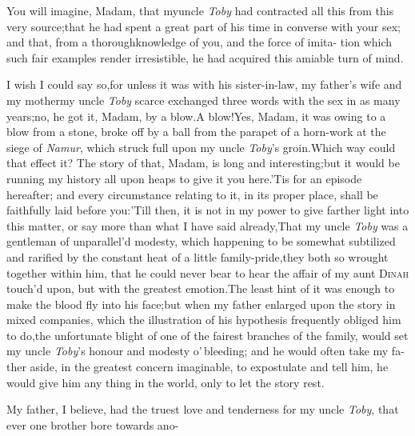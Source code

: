 \documentclass{article}
\begin{document}
You will imagine, Madam, that my\break uncle \textit{Toby} had
contracted all this from this very source;\tsk  that he had spent a great
part of his time in converse with your sex; and that, from a
thorough\break knowledge of you, and the force of imita- tion which such
fair examples render irresistible, he had acquired this amiable
turn of mind.

I wish I could say so,\tsk  for unless it was with his
sister-in-law, my father’s wife and my mother\tsh  my
uncle \textit{Toby} scarce exchanged three words with the sex in as
many years;\tsh  no, he got it, Madam, by a
blow.\tsh  A blow!\tsk  Yes, Madam, it was owing to a
blow from a stone, broke off by a ball from the parapet of a
horn-work at the siege of \textit{Namur}, which struck full upon my uncle
\textit{Toby}’s groin.\tsk  Which way could that effect it?
The story of that, Madam, is long and interesting;\tsk  but it
would be running my history all upon heaps to give it you
here.\tsh  ’Tis for an episode hereafter; and every
circumstance relating to it, in its proper place, shall be
faithfully laid before you:\tsk  ’Till then, it is not in my
power to give farther light into this matter, or say more than what I have said
already,\tsh  That my uncle \textit{Toby} was a gentleman of
unparallel’d modesty, which happening to be somewhat
subtilized and rarified by the constant heat of a little family-pride,\tsh  they
both so wrought together within him, that he could never bear to hear the affair of
my aunt \textsc{Dinah} touch’d upon, but with the greatest emotion.\tsh  The least
hint of it was enough to make the blood fly into his face;\tsk  but when my father
enlarged upon the story in mixed companies, which the illustration of his hypothesis
frequently obliged him to do,\tsk  the unfortunate blight of one of the fairest
branches of the family, would set my uncle \textit{Toby}’s honour and modesty
o’\,bleed\-ing; and he would often take my fa- ther aside, in the greatest concern
imaginable, to expostulate and tell him, he would give him any thing in the world,
only to let the story rest.

My father, I believe, had the truest love and tenderness for my uncle \textit{Toby},
that ever one brother bore towards ano-\break
{}
\end{document}
